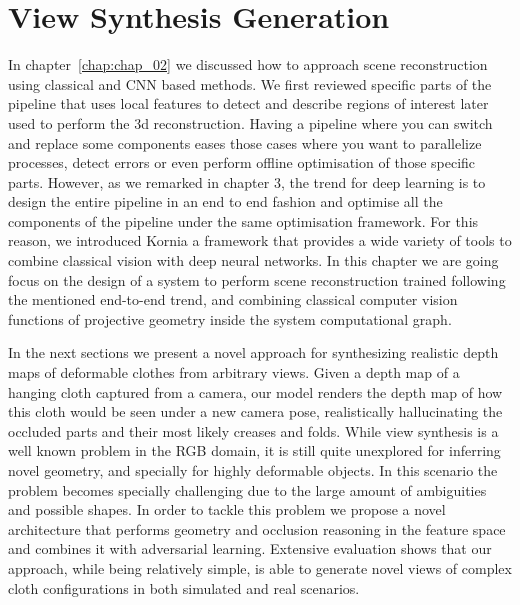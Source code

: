 \chapter{View Synthesis Generation}
\label{chap:chap_05}
\vspace{-8mm}

In chapter~\ref{chap:chap_02} we discussed how to approach scene reconstruction using classical and CNN based methods. We first reviewed specific parts of the pipeline that uses local features to detect and describe regions of interest later used to perform the 3d reconstruction. Having a pipeline where you can switch and replace some components eases those cases where you want to parallelize processes, detect errors or even perform offline optimisation of those specific parts. However, as we remarked in chapter 3, the trend for deep learning is to design the entire pipeline in an end to end fashion and optimise all the components of the pipeline under the same optimisation framework. For this reason, we introduced Kornia a framework that provides a wide variety of tools to combine classical vision with deep neural networks. In this chapter we are going focus on the design of a system to perform scene reconstruction trained following the mentioned end-to-end trend, and combining classical computer vision functions of projective geometry inside the system computational graph.

In the next sections we present a novel approach for synthesizing realistic depth maps of deformable clothes from arbitrary views. Given a depth map of a hanging cloth captured from a camera, our model renders the depth map of how this cloth would be seen under a new camera pose, realistically hallucinating the occluded parts and their most likely creases and folds. While view synthesis is a well known problem in the RGB domain, it is still quite unexplored for inferring novel geometry, and specially for highly deformable objects. In this scenario the problem becomes specially challenging due to the large amount of ambiguities and possible shapes. In order to tackle this  problem we propose a novel architecture that performs geometry and occlusion reasoning in the feature space and combines it with adversarial learning. Extensive evaluation shows that our approach, while being relatively simple, is able to generate novel views of complex cloth configurations in both simulated and real scenarios. 

\newpage

